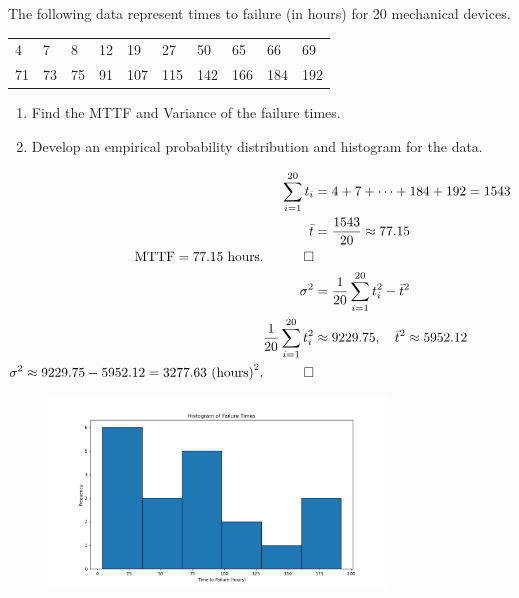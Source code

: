 \begin{hwkProblem}{1}{}

	The following data represent times to failure (in hours) for 20 mechanical devices.
	\begin{center}
		\begin{tabular}{llllllllll}
			4 & 7 & 8 & 12 & 19 & 27 & 50 & 65 & 66 & 69 \\
			71 & 73 & 75 & 91 & 107 & 115 & 142 & 166 & 184 & 192 \\
		\end{tabular}
	\end{center}
	\begin{enumerate}
		\item Find the MTTF and Variance of the failure times.
		\item Develop an empirical probability distribution and histogram for the data.
	\end{enumerate}

	\hwkSol

	\hwkPart
	\begin{align*}
		\sum_{i=1}^{20} t_i &= 4+7+\cdots+184+192 = 1543 \\
		\bar{t} &= \frac{1543}{20} \approx 77.15 \\
		\text{MTTF} = 77.15 \text{ hours}. \quad \qed \\
		\sigma^2 &= \frac{1}{20}\sum_{i=1}^{20} t_i^2 - \bar{t}^2 \\
		\frac{1}{20}\sum_{i=1}^{20} t_i^2 &\approx 9229.75,\quad \bar{t}^2\approx 5952.12 \\
		\sigma^2 \approx 9229.75 - 5952.12 = 3277.63 \text{ (hours)}^2. \quad \qed
	\end{align*}

	\hwkPart

	\begin{figure}[H]
		\centering
		\includegraphics[width=0.8\textwidth]{./images/s01b1.png}
	\end{figure}


\end{hwkProblem}
